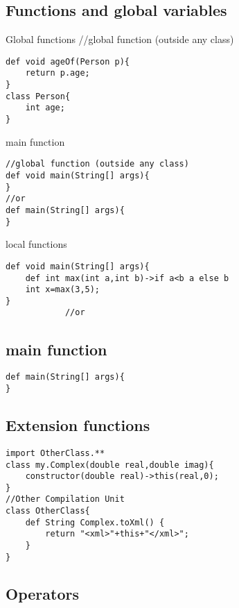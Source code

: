 \documentclass{tufte-book}
\begin{document}
            \subsection{Functions and global variables}
            Global functions
//global function (outside any class)
            \begin{lstlisting}
def void ageOf(Person p){
    return p.age;
}
class Person{
    int age;
}
            \end{lstlisting}
            main function
            \begin{lstlisting}
//global function (outside any class)
def void main(String[] args){
}
//or
def main(String[] args){
}
            \end{lstlisting}
            local functions
            \begin{lstlisting}
def void main(String[] args){
    def int max(int a,int b)->if a<b a else b
    int x=max(3,5);
}
            //or
            \end{lstlisting}


            \subsection{main function}
            \begin{lstlisting}
def main(String[] args){
}
            \end{lstlisting}


            \subsection{Extension functions}
            \begin{lstlisting}
import OtherClass.**
class my.Complex(double real,double imag){
    constructor(double real)->this(real,0);
}
//Other Compilation Unit
class OtherClass{
    def String Complex.toXml() {
        return "<xml>"+this+"</xml>";
    }
}
            \end{lstlisting}


            \subsection{Operators}
\end{document}
